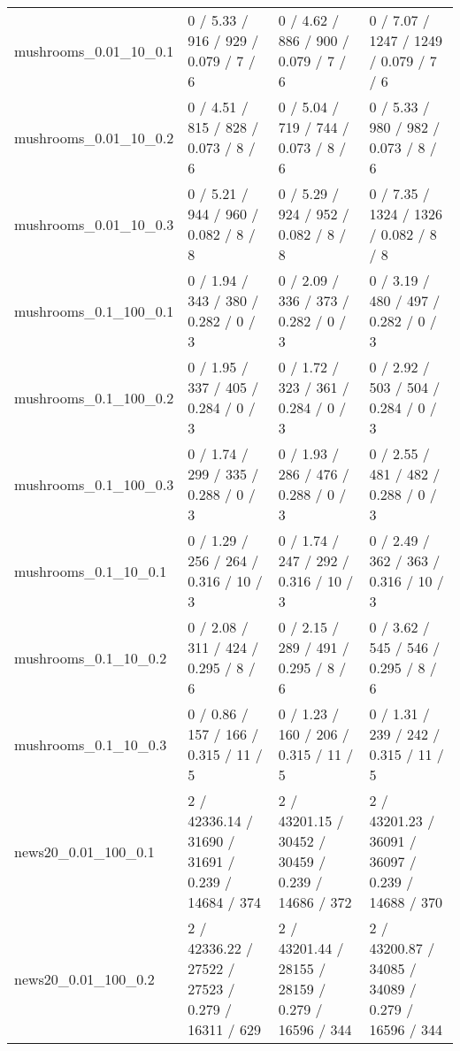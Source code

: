 \begin{tabular}{llll}
     mushrooms\_0.01\_10\_0.1 &      0 / 5.33 /    916 /     929 / 0.079 /      7 /      6 &      0 / 4.62 /    886 /     900 / 0.079 /      7 /      6 &      0 / 7.07 /   1247 /    1249 / 0.079 /      7 /      6 \\
     mushrooms\_0.01\_10\_0.2 &      0 / 4.51 /    815 /     828 / 0.073 /      8 /      6 &      0 / 5.04 /    719 /     744 / 0.073 /      8 /      6 &      0 / 5.33 /    980 /     982 / 0.073 /      8 /      6 \\
     mushrooms\_0.01\_10\_0.3 &      0 / 5.21 /    944 /     960 / 0.082 /      8 /      8 &      0 / 5.29 /    924 /     952 / 0.082 /      8 /      8 &      0 / 7.35 /   1324 /    1326 / 0.082 /      8 /      8 \\
     mushrooms\_0.1\_100\_0.1 &      0 / 1.94 /    343 /     380 / 0.282 /      0 /      3 &      0 / 2.09 /    336 /     373 / 0.282 /      0 /      3 &      0 / 3.19 /    480 /     497 / 0.282 /      0 /      3 \\
     mushrooms\_0.1\_100\_0.2 &      0 / 1.95 /    337 /     405 / 0.284 /      0 /      3 &      0 / 1.72 /    323 /     361 / 0.284 /      0 /      3 &      0 / 2.92 /    503 /     504 / 0.284 /      0 /      3 \\
     mushrooms\_0.1\_100\_0.3 &      0 / 1.74 /    299 /     335 / 0.288 /      0 /      3 &      0 / 1.93 /    286 /     476 / 0.288 /      0 /      3 &      0 / 2.55 /    481 /     482 / 0.288 /      0 /      3 \\
      mushrooms\_0.1\_10\_0.1 &      0 / 1.29 /    256 /     264 / 0.316 /     10 /      3 &      0 / 1.74 /    247 /     292 / 0.316 /     10 /      3 &      0 / 2.49 /    362 /     363 / 0.316 /     10 /      3 \\
      mushrooms\_0.1\_10\_0.2 &      0 / 2.08 /    311 /     424 / 0.295 /      8 /      6 &      0 / 2.15 /    289 /     491 / 0.295 /      8 /      6 &      0 / 3.62 /    545 /     546 / 0.295 /      8 /      6 \\
      mushrooms\_0.1\_10\_0.3 &      0 / 0.86 /    157 /     166 / 0.315 /     11 /      5 &      0 / 1.23 /    160 /     206 / 0.315 /     11 /      5 &      0 / 1.31 /    239 /     242 / 0.315 /     11 /      5 \\
       news20\_0.01\_100\_0.1 &  2 / 42336.14 /  31690 /   31691 / 0.239 /  14684 /    374 &  2 / 43201.15 /  30452 /   30459 / 0.239 /  14686 /    372 &  2 / 43201.23 /  36091 /   36097 / 0.239 /  14688 /    370 \\
       news20\_0.01\_100\_0.2 &  2 / 42336.22 /  27522 /   27523 / 0.279 /  16311 /    629 &  2 / 43201.44 /  28155 /   28159 / 0.279 /  16596 /    344 &  2 / 43200.87 /  34085 /   34089 / 0.279 /  16596 /    344 \\

\end{tabular}
